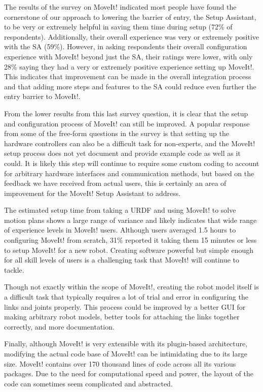 \documentclass[10pt,journal,compsoc]{joser1}
\begin{document}
{The results of the survey on MoveIt! indicated most people have found the
cornerstone of our approach to lowering the barrier of entry, the Setup
Assistant, to be very or extremely helpful in saving them time during setup
(72\% of respondents). Additionally, their overall experience was very or
extremely positive with the SA (59\%). However, in asking respondents their
overall configuration experience with MoveIt! beyond just the SA, their ratings
were lower, with only 28\% saying they had a very or extremely positive
experience setting up MoveIt!. This indicates that improvement can be made in
the overall integration process and that adding more steps and features to the
SA could reduce even further the entry barrier to MoveIt!. 

From the lower results from this last survey question, it is clear that the
setup and configuration process of MoveIt! can still be improved. A popular
response from some of the free-form questions in the survey is that setting up
the hardware controllers can also be a difficult task for non-experts, and the
MoveIt! setup process does not yet document and provide example code as well as
it could. It is likely this step will continue to require some custom coding to
account for arbitrary hardware interfaces and communication methods, but based
on the feedback we have received from actual users, this is certainly an area of
improvement for the MoveIt! Setup Assistant to address. 

The estimated setup time from taking a URDF and using MoveIt! to solve motion
plans shows a large range of variance and likely indicates that wide range of
experience levels in MoveIt! users. Although users averaged 1.5 hours to
configuring MoveIt! from scratch, 31\% reported it taking them 15 minutes or
less to setup MoveIt! for a new robot. Creating software powerful but simple
enough for all skill levels of users is a challenging task that MoveIt! will
continue to tackle.

Though not exactly within the scope of MoveIt!, creating the robot model itself
is a difficult task that typically requires a lot of trial and error in
configuring the links and joints properly. This process could be improved by a
better GUI for making arbitrary robot models, better tools for attaching the
links together correctly, and more documentation.

Finally, although MoveIt! is very extensible with its plugin-based architecture,
modifying the actual code base of MoveIt! can be intimidating due to its large
size. MoveIt! contains over 170 thousand lines of code across all its various
packages. Due to the need for computational speed and power, the layout of the
code can sometimes seem complicated and abstracted. 

}
\end{document}

